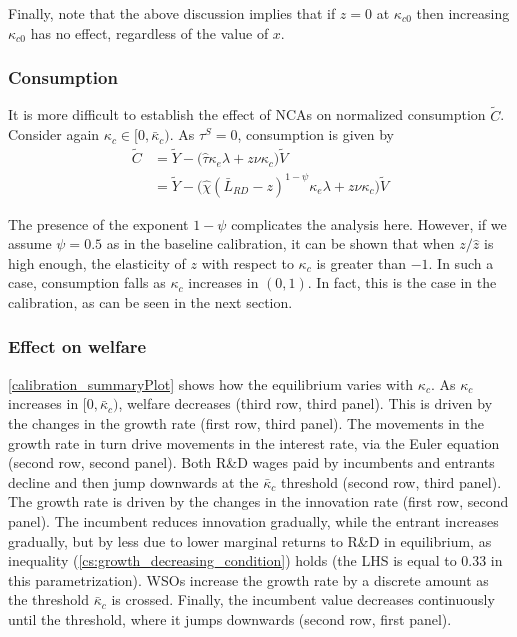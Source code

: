 \documentclass[11pt,english]{article}
\begin{document}
Finally, note that the above discussion implies that if $z = 0$ at $\kappa_{c0}$ then increasing $\kappa_{c0}$ has no effect, regardless of the value of $x$. 

\subsubsection{Consumption}\label{cs:consumption1}

It is more difficult to establish the effect of NCAs on normalized consumption $\tilde{C}$. Consider again $\kappa_c \in [0, \bar{\kappa}_c)$. As $\tau^S = 0$, consumption is given by 
\begin{align}
\tilde{C} &= \tilde{Y} - \Big( \hat{\tau}  \kappa_e \lambda + z \nu \kappa_c \Big) \tilde{V} \\
&= \tilde{Y} - \Big( \hat{\chi} (\bar{L}_{RD} - z)^{1-\psi} \kappa_e \lambda + z \nu \kappa_c \Big) \tilde{V} \label{cs:consumption_eq}
\end{align}

The presence of the exponent $1-\psi$ complicates the analysis here. However, if we assume $\psi = 0.5$ as in the baseline calibration, it can be shown that when $z / \hat{z}$ is high enough, the elasticity of $z$ with respect to $\kappa_c$ is greater than $-1$. In such a case, consumption falls as $\kappa_c$ increases in $(0,1)$. In fact, this is the case in the calibration, as can be seen in the next section.

\subsubsection{Effect on welfare}

\autoref{calibration_summaryPlot} shows how the equilibrium varies with $\kappa_c$. As $\kappa_c$ increases in $[0,\bar{\kappa}_c)$, welfare decreases (third row, third panel). This is driven by the changes in the growth rate (first row, third panel). The movements in the growth rate in turn drive movements in the interest rate, via the Euler equation (second row, second panel). Both R\&D wages paid by incumbents and entrants decline and then jump downwards at the $\bar{\kappa}_c$ threshold (second row, third panel). The growth rate is driven by the changes in the innovation rate (first row, second panel). The incumbent reduces innovation gradually, while the entrant increases gradually, but by less due to lower marginal returns to R\&D in equilibrium, as inequality (\ref{cs:growth_decreasing_condition}) holds (the LHS is equal to 0.33 in this parametrization). WSOs increase the growth rate by a discrete amount as the threshold $\bar{\kappa}_c$ is crossed. Finally, the incumbent value decreases continuously until the threshold, where it jumps downwards (second row, first panel). 
\end{document}
